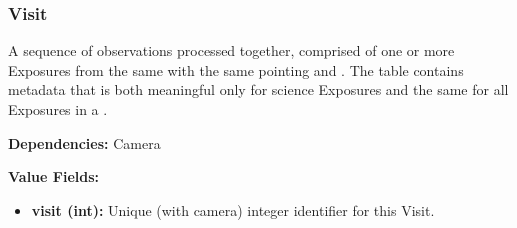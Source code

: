 \subsubsection{Visit}
\label{unit:Visit}

A sequence of observations processed together, comprised of one or
more Exposures from the same  with the same pointing
and . The  table contains
metadata that is both meaningful only for science Exposures and the
same for all Exposures in a .

\textbf{Dependencies:} Camera

\textbf{Value Fields:}
\begin{itemize}
  \item \textbf{visit (int):}
      Unique (with camera) integer identifier for this Visit.
\end{itemize}

